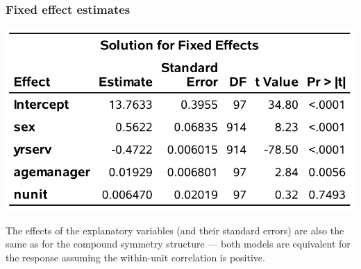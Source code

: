 \documentclass{beamer}
\begin{document}
\begin{frame}[fragile]
\frametitle{Fixed effect estimates}
\begin{center}
\includegraphics[width = 0.7\linewidth]{img/c6/slides7-e10}
\end{center}
{\footnotesize The effects of the explanatory variables (and their standard errors)
are also the same as for the compound symmetry structure --- both models are equivalent for the response assuming the within-unit correlation is positive. 


}
\end{frame}
\end{document}
